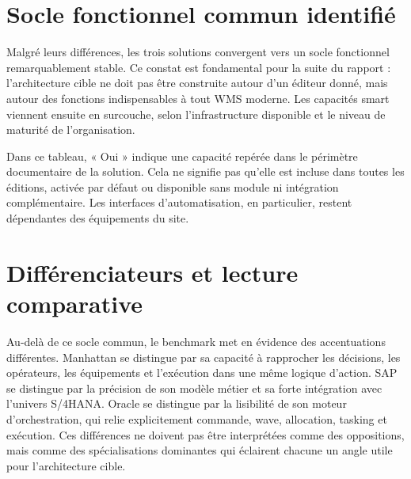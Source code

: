 
\section{Socle fonctionnel commun identifié}

\label{sec:2.6}

Malgré leurs différences, les trois solutions convergent vers un socle fonctionnel remarquablement stable. Ce constat est fondamental pour la suite du rapport : l’architecture cible ne doit pas être construite autour d’un éditeur donné, mais autour des fonctions indispensables à tout WMS moderne. Les capacités smart viennent ensuite en surcouche, selon l’infrastructure disponible et le niveau de maturité de l’organisation.




Dans ce tableau, « Oui » indique une capacité repérée dans le périmètre documentaire de la solution. Cela ne signifie pas qu’elle est incluse dans toutes les éditions, activée par défaut ou disponible sans module ni intégration complémentaire. Les interfaces d’automatisation, en particulier, restent dépendantes des équipements du site.


\section{Différenciateurs et lecture comparative}

\label{sec:2.7}

Au-delà de ce socle commun, le benchmark met en évidence des accentuations différentes. Manhattan se distingue par sa capacité à rapprocher les décisions, les opérateurs, les équipements et l’exécution dans une même logique d’action. SAP se distingue par la précision de son modèle métier et sa forte intégration avec l’univers S/4HANA. Oracle se distingue par la lisibilité de son moteur d’orchestration, qui relie explicitement commande, wave, allocation, tasking et exécution. Ces différences ne doivent pas être interprétées comme des oppositions, mais comme des spécialisations dominantes qui éclairent chacune un angle utile pour l’architecture cible.






